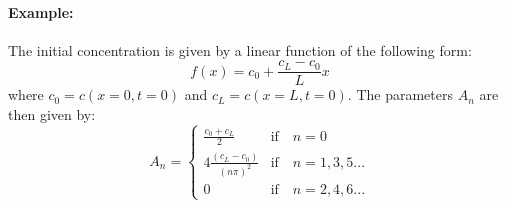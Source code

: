 \paragraph{Example:}The initial concentration is given by a linear function of the following form:
\begin{equation}
  f(x) = c_0 + \frac{c_L-c_0}{L}x
\end{equation}
where $c_0=c(x=0,t=0)$ and $c_L=c(x=L,t=0)$. The parameters $A_n$ are then given by:
\begin{equation}
  A_n = \begin{cases}
    \displaystyle \frac{c_0+c_L}{2} & \text{if} \quad n=0 \\[10pt]
    \displaystyle 4 \frac{(c_L-c_0)}{(n \pi)^2} & \text{if} \quad n = 1,3,5 ... \\[10pt]
    0 & \text{if} \quad n=2,4,6 ... 
  \end{cases}
\end{equation}

